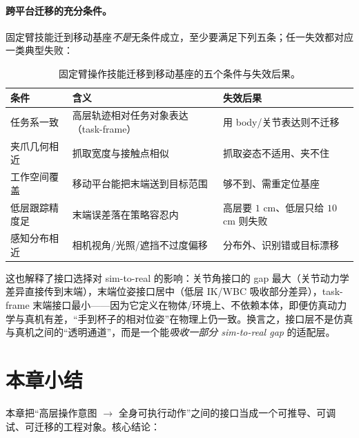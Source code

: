 \paragraph{跨平台迁移的充分条件。}
固定臂技能迁到移动基座\emph{不是}无条件成立，至少要满足下列五条；任一失效都对应一类典型失败：

\begin{table}[H]\centering\small
\caption{固定臂操作技能迁移到移动基座的五个条件与失效后果。}
\label{tab:si-transfer}
\begin{tabular}{p{3.4cm}p{5.0cm}p{4.0cm}}
\toprule
条件 & 含义 & 失效后果 \\
\midrule
任务系一致 & 高层轨迹相对任务对象表达（task-frame） & 用 body/关节表达则不迁移 \\
夹爪几何相近 & 抓取宽度与接触点相似 & 抓取姿态不适用、夹不住 \\
工作空间覆盖 & 移动平台能把末端送到目标范围 & 够不到、需重定位基座 \\
低层跟踪精度足 & 末端误差落在策略容忍内 & 高层要 $1$ cm、低层只给 $10$ cm 则失败 \\
感知分布相近 & 相机视角/光照/遮挡不过度偏移 & 分布外、识别错或目标漂移 \\
\bottomrule
\end{tabular}
\end{table}

\noindent 这也解释了接口选择对 sim-to-real 的影响：关节角接口的 gap 最大（关节动力学差异直接传到末端），末端位姿接口居中（低层 IK/WBC 吸收部分差异），task-frame 末端接口最小——因为它定义在物体/环境上、不依赖本体，即便仿真动力学与真机有差，“手到杯子的相对位姿”在物理上仍一致。换言之，接口层不是仿真与真机之间的“透明通道”，而是一个能\emph{吸收一部分 sim-to-real gap} 的适配层。

\section*{本章小结}

本章把“高层操作意图 $\to$ 全身可执行动作”之间的接口当成一个可推导、可调试、可迁移的工程对象。核心结论：

